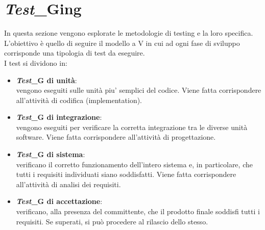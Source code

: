 \section{\textit{Test}_Ging}
In questa sezione vengono esplorate le metodologie di testing e la loro specifica. L'obiettivo è quello di seguire il modello a V in cui ad ogni fase di sviluppo corrisponde una tipologia di test da eseguire.\\
I test si dividono in:
\begin{itemize}
    \item \textbf{\textit{Test}_G di unità}:\\
    vengono eseguiti sulle unità piu' semplici del codice. Viene fatta corrispondere all'attività di codifica (implementation).
    \item \textbf{\textit{Test}_G di integrazione}:\\
    vengono eseguiti per verificare la corretta integrazione tra le diverse unità software. Viene fatta corrispondere all'attività di progettazione.
    \item \textbf{\textit{Test}_G di sistema}:\\
    verificano il corretto funzionamento dell'intero sistema e, in particolare, che tutti i requisiti individuati siano soddisfatti. Viene fatta corrispondere all'attività di analisi dei requisiti. 
    \item \textbf{\textit{Test}_G di accettazione}:\\
    verificano, alla presenza del committente, che il prodotto finale soddisfi tutti i requisiti. Se superati, si può procedere al rilascio dello stesso.
\end{itemize}